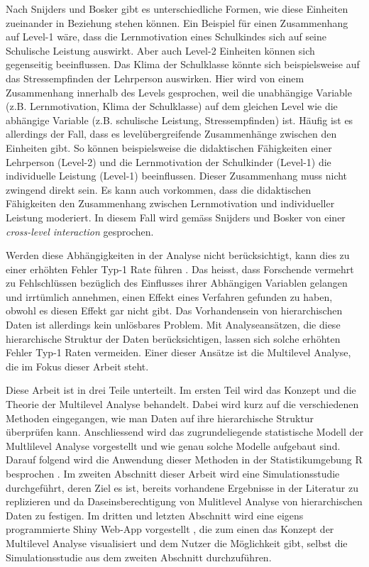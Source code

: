 \documentclass[12pt]{article}\usepackage[]{graphicx}\usepackage[]{color}
\numberwithin{equation}{section}
\begin{document}
Nach Snijders und Bosker \citeyearpar{SnijdersTomA.B2012Ma:a} gibt es unterschiedliche Formen, wie diese Einheiten zueinander in Beziehung stehen können. Ein Beispiel für einen Zusammenhang auf Level-1 wäre, dass die Lernmotivation eines Schulkindes sich auf seine Schulische Leistung auswirkt. Aber auch Level-2 Einheiten können sich gegenseitig beeinflussen. Das Klima der Schulklasse könnte sich beispielsweise auf das Stressempfinden der Lehrperson auswirken. Hier wird von einem Zusammenhang innerhalb des Levels gesprochen, weil die unabhängige Variable (z.B. Lernmotivation, Klima der Schulklasse) auf dem gleichen Level wie die abhängige Variable (z.B. schulische Leistung, Stressempfinden) ist. Häufig ist es allerdings der Fall, dass es levelübergreifende Zusammenhänge zwischen den Einheiten gibt. So können beispielsweise die didaktischen Fähigkeiten einer Lehrperson (Level-2) und die Lernmotivation der Schulkinder (Level-1) die individuelle Leistung (Level-1) beeinflussen. Dieser Zusammenhang muss nicht zwingend direkt sein. Es kann auch vorkommen, dass die didaktischen Fähigkeiten den Zusammenhang zwischen Lernmotivation und individueller Leistung moderiert. In diesem Fall wird gemäss Snijders und Bosker \citeyearpar{SnijdersTomA.B2012Ma:a} von einer \textit{cross-level interaction} gesprochen.

Werden diese Abhängigkeiten in der Analyse nicht berücksichtigt, kann dies zu einer erhöhten Fehler Typ-1 Rate führen \citep{dorman2008effect, mcneish2014analyzing}. Das heisst, dass Forschende vermehrt zu Fehlschlüssen bezüglich des Einflusses ihrer Abhängigen Variablen gelangen und irrtümlich annehmen, einen Effekt eines Verfahren gefunden zu haben, obwohl es diesen Effekt gar nicht gibt. Das Vorhandensein von hierarchischen Daten ist allerdings kein unlösbares Problem. Mit Analyseansätzen, die diese hierarchische Struktur der Daten berücksichtigen, lassen sich solche erhöhten Fehler Typ-1 Raten vermeiden. Einer dieser Ansätze ist die Multilevel Analyse, die im Fokus dieser Arbeit steht.

Diese Arbeit ist in drei Teile unterteilt. Im ersten Teil wird das Konzept und die Theorie der Multilevel Analyse behandelt. Dabei wird kurz auf die verschiedenen Methoden eingegangen, wie man Daten auf ihre hierarchische Struktur überprüfen kann. Anschliessend wird das zugrundeliegende statistische Modell der Multlilevel Analyse vorgestellt und wie genau solche Modelle aufgebaut sind. Darauf folgend wird die Anwendung dieser Methoden in der Statistikumgebung R besprochen \citep{R}. Im zweiten Abschnitt dieser Arbeit wird eine Simulationsstudie durchgeführt, deren Ziel es ist, bereits vorhandene Ergebnisse in der Literatur zu replizieren und da Daseinsberechtigung von Mulitlevel Analyse von hierarchischen Daten zu festigen. Im dritten und letzten Abschnitt wird eine eigens programmierte Shiny Web-App vorgestellt \citep{shiny}, die zum einen das Konzept der Multilevel Analyse visualisiert und dem Nutzer die Möglichkeit gibt, selbst die Simulationsstudie aus dem zweiten Abschnitt durchzuführen. 
\end{document}
